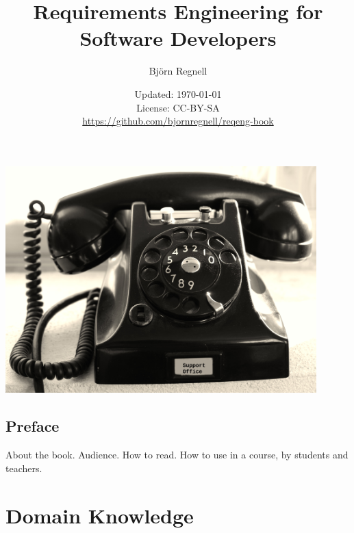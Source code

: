 \documentclass{reqengbook}
\title{
\bf\sffamily\fontsize{22}{28}\selectfont
Requirements Engineering for Software Developers
}
\author{\sffamily\fontsize{20}{30}\selectfont Björn Regnell}
\date{\vspace{2em}\sffamily\small Updated: \today 
\\ License: CC-BY-SA 
\\ \url{https://github.com/bjornregnell/reqeng-book} 
}
\begin{document}

\begin{minipage}{0.5\textwidth}
  \maketitle%
\end{minipage}%
\begin{minipage}{0.5\textwidth}
  \centering\vspace{2.2cm}
  \includegraphics[width=0.9\textwidth]{../img/phone-support.jpg}%
\end{minipage}%
\pagebreak

\setcounter{tocdepth}{3}


\begin{multicols*}{3}  %
\fontsize{8.4}{10}\selectfont

\tableofcontents
\end{multicols*}


\setcounter{chapter}{-1}
\begin{multicols*}{2}  %
\chapter{Preface}
About the book. Audience. How to read. How to use in a course, by students and teachers.
\end{multicols*}


\pagebreak


\part{Domain Knowledge}  %
\end{document}
